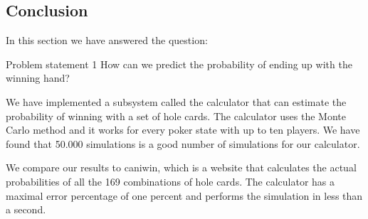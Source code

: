 \subsection{Conclusion}
In this section we have answered the question:
\vspace{4mm}
\begin{statementBox2}{Problem statement 1}
How can we predict the probability of ending up with the winning hand?
\end{statementBox2}
\vspace{4mm}

We have implemented a subsystem called the calculator that can estimate the probability of winning with a set of hole cards. The calculator uses the Monte Carlo method and it works for every poker state with up to ten players. We have found that 50.000 simulations is a good number of simulations for our calculator. 

We compare our results to caniwin, which is a website that calculates the actual probabilities of all the 169 combinations of hole cards. The calculator has a maximal error percentage of one percent and performs the simulation in less than a second.
